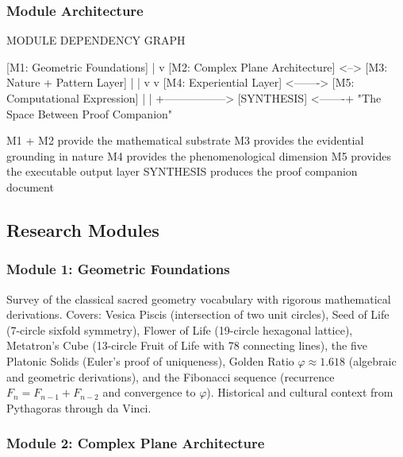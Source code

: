 \documentclass[11pt,letterpaper]{article}
\begin{document}
\subsubsection{Module Architecture}

\begin{asciibox}
MODULE DEPENDENCY GRAPH

  [M1: Geometric Foundations]
        |
        v
  [M2: Complex Plane Architecture] <--> [M3: Nature + Pattern Layer]
        |                                       |
        v                                       v
  [M4: Experiential Layer] <-------> [M5: Computational Expression]
        |                                       |
        +-----------------> [SYNTHESIS] <-------+
                             "The Space
                             Between Proof
                             Companion"

  M1 + M2 provide the mathematical substrate
  M3 provides the evidential grounding in nature
  M4 provides the phenomenological dimension
  M5 provides the executable output layer
  SYNTHESIS produces the proof companion document
\end{asciibox}

\subsection{Research Modules}

\subsubsection{Module 1: Geometric Foundations}

Survey of the classical sacred geometry vocabulary with rigorous mathematical derivations. Covers: Vesica Piscis (intersection of two unit circles), Seed of Life (7-circle sixfold symmetry), Flower of Life (19-circle hexagonal lattice), Metatron's Cube (13-circle Fruit of Life with 78 connecting lines), the five Platonic Solids (Euler's proof of uniqueness), Golden Ratio $\varphi \approx 1.618$ (algebraic and geometric derivations), and the Fibonacci sequence (recurrence $F_n = F_{n-1} + F_{n-2}$ and convergence to $\varphi$). Historical and cultural context from Pythagoras through da Vinci.

\subsubsection{Module 2: Complex Plane Architecture}
\end{document}
